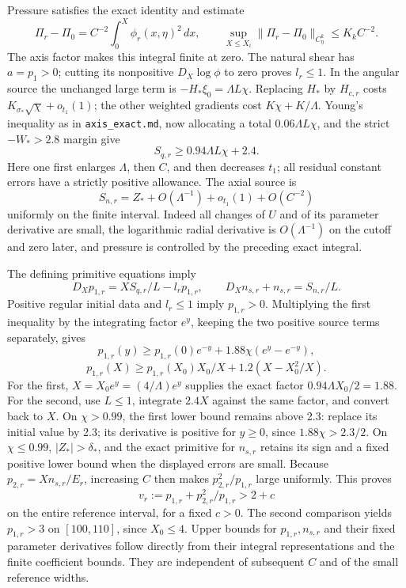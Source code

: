 \documentclass[10pt,a4paper]{article}
\begin{document}
Pressure satisfies the exact identity and estimate
\[
\Pi_r-\Pi_0=C^{-2}\int_0^X\phi_r(x,\eta)^2\,dx,
\qquad \sup_{X\le X_i}\|\Pi_r-\Pi_0\|_{C^k_\eta}\le K_kC^{-2}.
\]
The axis factor makes this integral finite at zero. The natural shear has \(a=p_1>0\); cutting its nonpositive \(D_X\log\phi\) to zero proves \(l_r\le1\). In the angular source the unchanged large term is \(-H_*\xi_0=\Lambda L\chi\). Replacing \(H_*\) by \(H_{c,r}\) costs \(K_{\sigma_*}\sqrt\chi+o_{t_1}(1)\); the other weighted gradients cost \(K\chi+K/\Lambda\). Young's inequality as in \texttt{axis\_exact.md}, now allocating a total \(0.06\Lambda L\chi\), and the strict \(-W_*>2.8\) margin give
\[
S_{q,r}\ge0.94\Lambda L\chi+2.4.
\]
Here one first enlarges \(\Lambda\), then \(C\), and then decreases \(t_1\); all residual constant errors have a strictly positive allowance. The axial source is
\[
S_{n,r}=Z_*+O(\Lambda^{-1})+o_{t_1}(1)+O(C^{-2})
\]
uniformly on the finite interval. Indeed all changes of \(U\) and of its parameter derivative are small, the logarithmic radial derivative is \(O(\Lambda^{-1})\) on the cutoff and zero later, and pressure is controlled by the preceding exact integral.

The defining primitive equations imply
\[
D_Xp_{1,r}=XS_{q,r}/L-l_rp_{1,r},\qquad
D_Xn_{s,r}+n_{s,r}=S_{n,r}/L.
\]
Positive regular initial data and \(l_r\le1\) imply \(p_{1,r}>0\). Multiplying the first inequality by the integrating factor \(e^y\), keeping the two positive source terms separately, gives
\[
p_{1,r}(y)\ge p_{1,r}(0)e^{-y}
+1.88\chi(e^y-e^{-y}),
\]
\[
p_{1,r}(X)\ge p_{1,r}(X_0)X_0/X
+1.2(X-X_0^2/X).
\]
For the first, \(X=X_0e^y=(4/\Lambda)e^y\) supplies the exact factor \(0.94\Lambda X_0/2=1.88\). For the second, use \(L\le1\), integrate \(2.4X\) against the same factor, and convert back to \(X\). On \(\chi>0.99\), the first lower bound remains above 2.3: replace its initial value by 2.3; its derivative is positive for \(y\ge0\), since \(1.88\chi>2.3/2\). On \(\chi\le0.99\), \(|Z_*|>\delta_*\), and the exact primitive for \(n_{s,r}\) retains its sign and a fixed positive lower bound when the displayed errors are small. Because \(p_{2,r}=Xn_{s,r}/E_r\), increasing \(C\) then makes \(p_{2,r}^2/p_{1,r}\) large uniformly. This proves
\[
v_r:=p_{1,r}+p_{2,r}^2/p_{1,r}>2+c
\]
on the entire reference interval, for a fixed \(c>0\). The second comparison yields \(p_{1,r}>3\) on \([100,110]\), since \(X_0\le4\). Upper bounds for \(p_{1,r},n_{s,r}\) and their fixed parameter derivatives follow directly from their integral representations and the finite coefficient bounds. They are independent of subsequent \(C\) and of the small reference widths.
\end{document}
